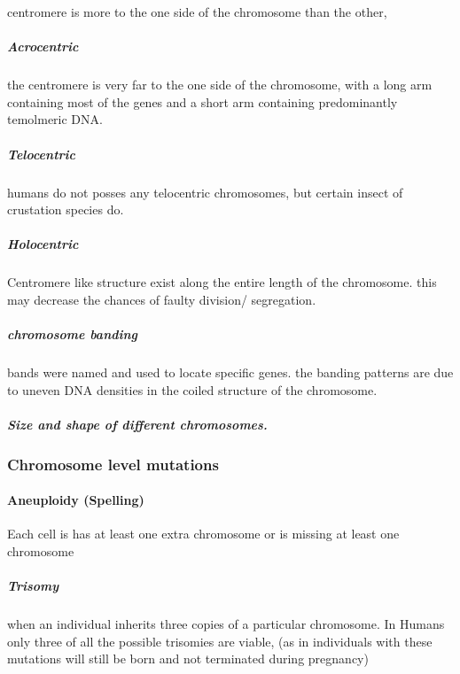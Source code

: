\documentclass[]{article}
\let\oldparagraph\paragraph
\renewcommand{\paragraph}[1]{\oldparagraph{#1}\mbox{}}
\let\oldsubparagraph\subparagraph
\renewcommand{\subparagraph}[1]{\oldsubparagraph{#1}\mbox{}}
\begin{document}
centromere is more to the one side of the chromosome than the other,

\hypertarget{acrocentric-1}{%
\subparagraph{Acrocentric}\label{acrocentric-1}}

the centromere is very far to the one side of the chromosome, with a
long arm containing most of the genes and a short arm containing
predominantly temolmeric DNA.

\hypertarget{telocentric-1}{%
\subparagraph{Telocentric}\label{telocentric-1}}

humans do not posses any telocentric chromosomes, but certain insect of
crustation species do.

\hypertarget{holocentric-1}{%
\subparagraph{Holocentric}\label{holocentric-1}}

Centromere like structure exist along the entire length of the
chromosome. this may decrease the chances of faulty division/
segregation.

\hypertarget{chromosome-banding-1}{%
\subparagraph{chromosome banding}\label{chromosome-banding-1}}

bands were named and used to locate specific genes. the banding patterns
are due to uneven DNA densities in the coiled structure of the
chromosome.

\hypertarget{size-and-shape-of-different-chromosomes.-1}{%
\subparagraph{Size and shape of different
chromosomes.}\label{size-and-shape-of-different-chromosomes.-1}}

\hypertarget{chromosome-level-mutations-1}{%
\subsubsection{Chromosome level
mutations}\label{chromosome-level-mutations-1}}

\hypertarget{aneuploidy-spelling-1}{%
\paragraph{Aneuploidy (Spelling)}\label{aneuploidy-spelling-1}}

Each cell is has at least one extra chromosome or is missing at least
one chromosome

\hypertarget{trisomy-1}{%
\subparagraph{Trisomy}\label{trisomy-1}}

when an individual inherits three copies of a particular chromosome. In
Humans only three of all the possible trisomies are viable, (as in
individuals with these mutations will still be born and not terminated
during pregnancy)
\end{document}
